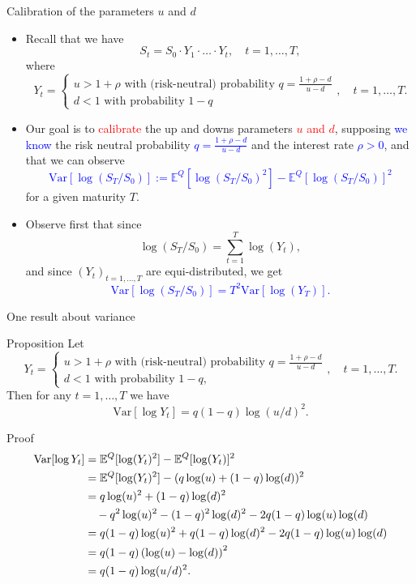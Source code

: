 \documentclass[9 pt]{beamer} %
\def \blue {\textcolor{blue}}
\def \red {\textcolor{red}}
\def \bE {\mathbb{E}}
\begin{document}
\begin{frame}{Calibration of the parameters $u$ and $d$}
\begin{itemize}
\item Recall that we have
$$
S_t=S_0\cdot Y_1 \cdot \dots \cdot Y_t, \quad t=1,\dots,T,
$$
where 
$$
Y_t = \begin{cases}
u > 1 + \rho \text{ with (risk-neutral) probability $q=\frac{1+\rho-d}{u-d}$} \\
d < 1  \text{ with probability $1-q$}
\end{cases},\quad t=1,\dots,T.
$$
\item Our goal is to \red{calibrate} the up and downs parameters \red{$u$ and $d$}, supposing \blue{we know} the risk neutral probability \blue{$q=\frac{1+\rho-d}{u-d}$} and the interest rate \blue{$\rho>0$}, and that we can observe
\blue{$$
\text{Var}[\log(S_T/S_0)]:=\bE^Q[\log(S_T/S_0)^2]-\bE^Q[\log(S_T/S_0)]^2
$$}
for a given maturity $T$.
\item Observe first that since
$$
\log(S_T/S_0)=\sum_{t=1}^T\log(Y_t), 
$$
and since $(Y_t)_{t=1,\dots,T}$ are equi-distributed, we get
\blue{$$
\text{Var}[\log(S_T/S_0)]=T^2 \text{Var}[\log(Y_T)].
$$}
\end{itemize}
\end{frame}


\begin{frame}{One result about variance}
\begin{block}{Proposition}
Let 
$$
Y_t = \begin{cases}
u > 1 + \rho \text{ with (risk-neutral) probability $q=\frac{1+\rho-d}{u-d}$} \\
d < 1  \text{ with probability $1-q$},
\end{cases},\quad t=1,\dots,T.
$$
Then for any $t=1,\dots,T$ we have 
$$
\text{Var}[\log{Y_t}]=q(1-q)\log(u/d)^2.
$$
\end{block}
\begin{block}{Proof}
\begin{align}
\text{Var}[\log{Y_t}]&=\mathbb{E}^Q[\log(Y_t)^2]-\mathbb{E}^Q[\log(Y_t)]^2 \notag \\
&=\mathbb{E}^Q[\log(Y_t)^2] - (q\log(u)+(1-q)\log(d))^2 \notag \\
&=q\log(u)^2+(1-q)\log(d)^2 \notag \\
& \quad - q^2\log(u)^2 - (1-q)^2\log(d)^2 -  2q(1-q)\log(u)\log(d)\notag \\
&=q(1-q)\log(u)^2+q(1-q)\log(d)^2 -2q(1-q)\log(u)\log(d) \notag \\
&=q(1-q)\left(\log(u)-\log(d)\right)^2 \notag \\
&=q(1-q)\log(u/d)^2.
\end{align}
\end{block}
\end{frame}
\end{document}
